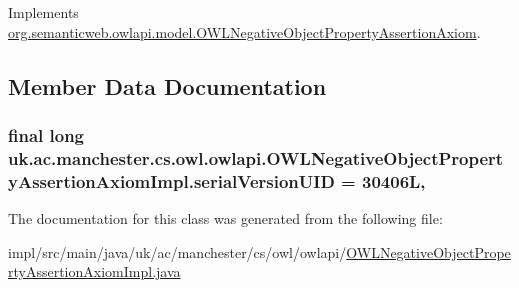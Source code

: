 Implements \hyperlink{interfaceorg_1_1semanticweb_1_1owlapi_1_1model_1_1_o_w_l_negative_object_property_assertion_axiom_adffa4f80e950459c4927e019cb190ed9}{org.\-semanticweb.\-owlapi.\-model.\-O\-W\-L\-Negative\-Object\-Property\-Assertion\-Axiom}.



\subsection{Member Data Documentation}
\hypertarget{classuk_1_1ac_1_1manchester_1_1cs_1_1owl_1_1owlapi_1_1_o_w_l_negative_object_property_assertion_axiom_impl_a0ddedd33cbbd04291ca65afaa16389be}{
\subsubsection[{serial\-Version\-U\-I\-D}]{\setlength{\rightskip}{0pt plus 5cm}final long uk.\-ac.\-manchester.\-cs.\-owl.\-owlapi.\-O\-W\-L\-Negative\-Object\-Property\-Assertion\-Axiom\-Impl.\-serial\-Version\-U\-I\-D = 30406\-L\hspace{0.3cm}{\ttfamily [static]}, {\ttfamily [private]}}}\label{classuk_1_1ac_1_1manchester_1_1cs_1_1owl_1_1owlapi_1_1_o_w_l_negative_object_property_assertion_axiom_impl_a0ddedd33cbbd04291ca65afaa16389be}


The documentation for this class was generated from the following file\-:\begin{DoxyCompactItemize}
\item 
impl/src/main/java/uk/ac/manchester/cs/owl/owlapi/\hyperlink{_o_w_l_negative_object_property_assertion_axiom_impl_8java}{O\-W\-L\-Negative\-Object\-Property\-Assertion\-Axiom\-Impl.\-java}\end{DoxyCompactItemize}
